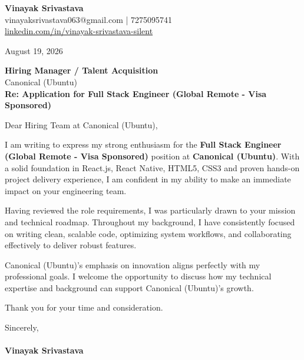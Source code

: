 \documentclass[11pt,a4paper]{article}
\begin{document}
\thispagestyle{empty}

{\Large \textbf{Vinayak Srivastava}}\\
vinayaksrivastava063@gmail.com | 7275095741 \\
\url{linkedin.com/in/vinayak-srivastava-silent}

\vspace{1em}
\hfill August 19, 2026

\textbf{Hiring Manager / Talent Acquisition}\\
Canonical (Ubuntu)\\

\vspace{1.5em}
\textbf{Re: Application for Full Stack Engineer (Global Remote - Visa Sponsored)}

\vspace{1em}
Dear Hiring Team at Canonical (Ubuntu),

I am writing to express my strong enthusiasm for the \textbf{Full Stack Engineer (Global Remote - Visa Sponsored)} position at \textbf{Canonical (Ubuntu)}. With a solid foundation in React.js, React Native, HTML5, CSS3 and proven hands-on project delivery experience, I am confident in my ability to make an immediate impact on your engineering team.

Having reviewed the role requirements, I was particularly drawn to your mission and technical roadmap. Throughout my background, I have consistently focused on writing clean, scalable code, optimizing system workflows, and collaborating effectively to deliver robust features.

Canonical (Ubuntu)'s emphasis on innovation aligns perfectly with my professional goals. I welcome the opportunity to discuss how my technical expertise and background can support Canonical (Ubuntu)'s growth.

Thank you for your time and consideration.

\vspace{1.5em}
Sincerely,\\
\vspace{1em}\\
\textbf{Vinayak Srivastava}
\end{document}
